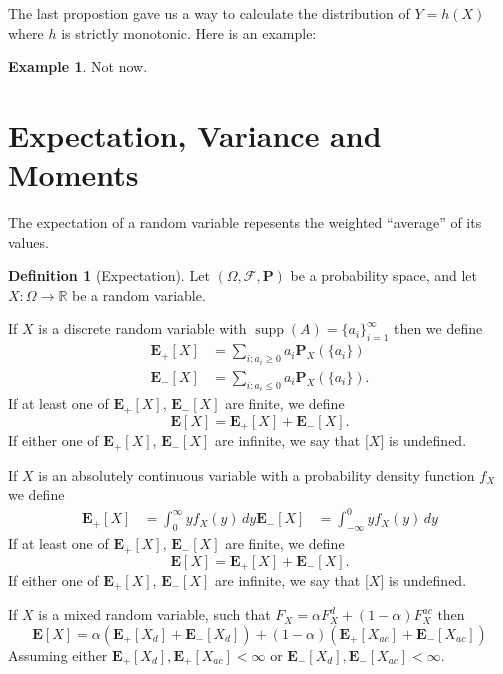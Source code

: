 \documentclass[11pt,a4paper]{article}
\theoremstyle{definition}
\newtheorem{definition}{Definition}[section]
\newtheorem{example}{Example}[section]
\theoremstyle{plain}
\DeclareMathOperator{\supp}{supp}
\newcommand{\R}{\mathbb{R}}
\newcommand{\E}{\mathbf{E}}
\newcommand{\Prob}{\mathbf{P}}
\begin{document}
  The last propostion gave us a way to calculate the distribution of
  $Y = h(X)$ where $h$ is strictly monotonic. Here is an example:
  \begin{example}
    Not now.
  \end{example}

  \newpage

  \section{Expectation, Variance and Moments}

  The expectation of a random variable repesents the weighted ``average'' of 
  its values.

  \begin{definition}[Expectation]
    Let $(\Omega, \mathcal F, \Prob)$ be a probability space,
    and let $X \colon \Omega \to \R$ be a random variable.

    If $X$ is a discrete random variable with 
    $\supp(A) = \{a_i\}_{i=1}^{\infty}$ then we define
    \begin{align*}
      \E_{+}[X] &=
      \sum_{i \colon a_i \geq 0} a_i \Prob_X\left(\{a_i\}\right) \\
      \E_{-}[X] &=
      \sum_{i \colon a_i \le 0} a_i \Prob_X\left(\{a_i\}\right).
    \end{align*}
    If at least one of $\E_{+}[X]$, $\E_{-}[X]$ are finite, 
    we define
    \[
      \E[X] = \E_{+}[X] + \E_{-}[X].
    \]
    If either one of $\E_{+}[X]$, $\E_{-}[X]$ are infinite,
    we say that $\mathbf [X]$ is undefined.

    If $X$ is an absolutely continuous variable with a probability density
    function $f_X$ we define
    \begin{align*}
      \E_{+}[X] &=
      \int_{0}^{\infty} y f_X(y)\,dy
      \E_{-}[X] &=
      \int_{-\infty}^{0} y f_X(y)\,dy
    \end{align*}
    If at least one of $\E_{+}[X]$, $\E_{-}[X]$ are finite, 
    we define
    \[
      \E[X] = \E_{+}[X] + \E_{-}[X].
    \]
    If either one of $\E_{+}[X]$, $\E_{-}[X]$ are infinite,
    we say that $\mathbf [X]$ is undefined.

    If $X$ is a mixed random variable, such that 
    $F_X = \alpha F_X^d + (1-\alpha)F_X^{ac}$ then
    \[
      \E[X] = 
      \alpha (\E_{+}[X_d] + \E_{-}[X_d]) +
      (1 - \alpha) (\E_{+}[X_{ac}] + \E_{-}[X_{ac}])
    \]
    Assuming either $\E_+[X_{d}], \E_+[X_{ac}] < \infty$ or
    $\E_-[X_{d}], \E_-[X_{ac}] < \infty$.
  \end{definition}
  
\end{document}
